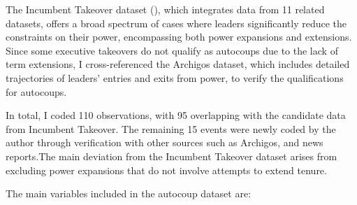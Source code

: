 \documentclass[
  12pt,
]{report}
\begin{document}
The Incumbent Takeover dataset (), which integrates data from 11 related datasets, offers
a broad spectrum of cases where leaders significantly reduce the
constraints on their power, encompassing both power expansions and
extensions. Since some executive takeovers do not qualify as autocoups
due to the lack of term extensions, I cross-referenced the Archigos
dataset, which includes detailed trajectories of leaders' entries and
exits from power, to verify the qualifications for autocoups.

In total, I coded 110 observations, with 95 overlapping with the
candidate data from Incumbent Takeover. The remaining 15 events were
newly coded by the author through verification with other sources such
as Archigos, and news reports.The main deviation from the Incumbent
Takeover dataset arises from excluding power expansions that do not
involve attempts to extend tenure.

The main variables included in the autocoup dataset are:
\end{document}
